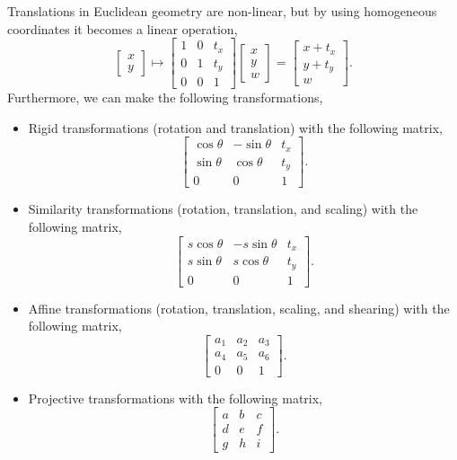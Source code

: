 Translations in Euclidean geometry are non-linear, but by using homogeneous
coordinates it becomes a linear operation, \[
  \begin{bmatrix} x \\ y \end{bmatrix} \mapsto \begin{bmatrix} 1 & 0 & t_x \\ 0 & 1 & t_y \\ 0 & 0 & 1 \end{bmatrix} \begin{bmatrix} x \\ y \\ w  \end{bmatrix} = \begin{bmatrix} x + t_x \\ y + t_y \\ w \end{bmatrix} 
.\]
Furthermore, we can make the following transformations,
\begin{itemize}
  \item Rigid transformations (rotation and translation) with the following
    matrix,
    \[
      \begin{bmatrix} \cos\theta & -\sin\theta & t_x \\ \sin\theta & \cos\theta  & t_y \\ 0 & 0 & 1 \end{bmatrix}
    .\]
  \item Similarity transformations (rotation, translation, and scaling) with
    the following matrix, \[
      \begin{bmatrix} s\cos\theta & -s\sin\theta & t_x \\ s\sin\theta & s\cos\theta & t_y \\ 0 & 0 & 1 \end{bmatrix}
    .\]
  \item Affine transformations (rotation, translation, scaling, and shearing)
    with the following matrix, \[
      \begin{bmatrix} a_1 & a_2 & a_3 \\ a_4 & a_5 & a_6 \\ 0 & 0 & 1 \end{bmatrix}
    .\]
  \item Projective transformations with the following matrix, \[
      \begin{bmatrix} a & b & c \\ d & e & f \\ g & h & i \end{bmatrix}
    .\]
\end{itemize}

